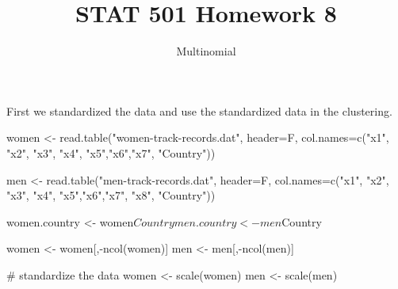 \documentclass{article}
\begin{document}
	

	
	\title{STAT 501 Homework 8}
	\author{Multinomial}
	\maketitle

	First we standardized the data and use the standardized data in the clustering.
	\begin{rcode}
women <- read.table("women-track-records.dat",
                    header=F, col.names=c("x1", "x2", "x3", "x4", "x5","x6","x7", "Country"))

men <- read.table("men-track-records.dat",
                    header=F, col.names=c("x1", "x2", "x3", "x4", "x5","x6","x7", "x8", "Country"))

women.country <- women$Country
men.country <- men$Country

women <- women[,-ncol(women)]
men <- men[,-ncol(men)]

# standardize the data
women <- scale(women)
men <- scale(men)
	\end{rcode}
	
\end{document}
